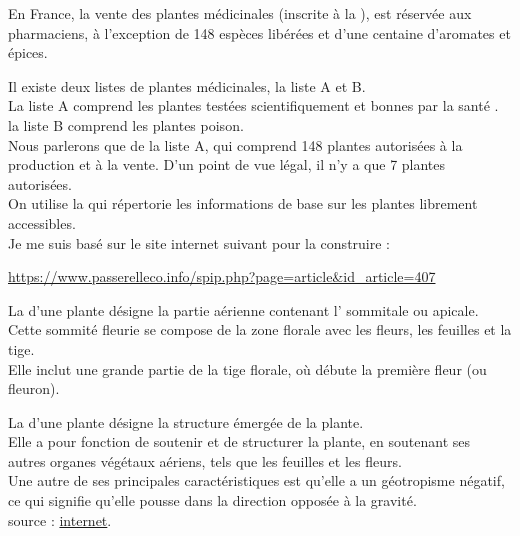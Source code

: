 En France, la vente des plantes médicinales (inscrite à la ), est réservée aux pharmaciens, à l’exception de 148 espèces libérées et d’une centaine d’aromates et épices.


Il existe deux listes de plantes médicinales, la liste A et B. \\
La liste A comprend les plantes testées scientifiquement et bonnes par la santé .\\
la liste B comprend les plantes poison.\\
Nous parlerons que de la liste A, qui comprend 148 plantes autorisées à la production et à la vente. D'un point de vue légal, il n'y a que 7 plantes autorisées.\\

On utilise la  qui répertorie les informations de base sur les plantes librement accessibles. \\

Je me suis basé sur le site internet suivant pour la construire : \\
\begin{center}\href{https://www.passerelleco.info/spip.php?page=article\&id_article=407}{https://www.passerelleco.info/spip.php?page=article\&id\_article=407}\end{center}

\begin{Defi}
    \label{sommite}
    La  d'une plante désigne la partie aérienne contenant l' sommitale ou apicale.\\
    Cette sommité fleurie se compose de la zone florale avec les fleurs, les feuilles et la tige.\\
    Elle inclut une grande partie de la tige florale, où débute la première fleur (ou fleuron).
\end{Defi}

\begin{Defi}
    \label{aerienne}
    La  d'une plante désigne la structure émergée de la plante.\\
    Elle a pour fonction de soutenir et de structurer la plante, en soutenant ses autres organes végétaux aériens, tels que les feuilles et les fleurs.\\ Une autre de ses principales caractéristiques est qu'elle a un géotropisme négatif, ce qui signifie qu'elle pousse dans la direction opposée à la gravité.\\
    source : \href{https://www.projetecolo.com/anatomie-d-une-plante-les-parties-d-une-plante-avec-schema-31.html}{internet}.
\end{Defi}

